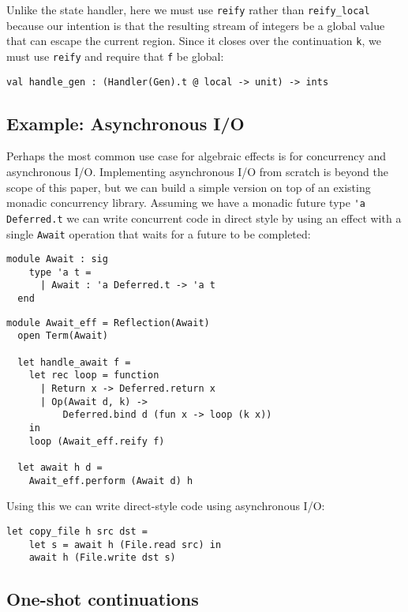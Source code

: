 \documentclass[acmsmall, screen, review, anonymous]{acmart}
\theoremstyle{definition}
\begin{document}
Unlike the state handler, here we must use
\lstinline[style=oxcaml]{reify} rather than
\lstinline[style=oxcaml]{reify_local} because our intention is that the
resulting stream of integers be a global value that can escape the
current region. Since it closes over the continuation
\lstinline[style=oxcaml]{k}, we must use \lstinline[style=oxcaml]{reify}
and require that \lstinline[style=oxcaml]{f} be global:
\begin{lstlisting}[style=oxcaml]
  val handle_gen : (Handler(Gen).t @ local -> unit) -> ints
\end{lstlisting}

\subsection{Example: Asynchronous I/O}

Perhaps the most common use case for algebraic effects is for
concurrency and asynchronous I/O. Implementing asynchronous I/O from
scratch is beyond the scope of this paper, but we can build a simple
version on top of an existing monadic concurrency library. Assuming we
have a monadic future type \lstinline[style=oxcaml]{'a Deferred.t} we can
write concurrent code in direct style by using an effect with a single
\lstinline[style=oxcaml]{Await} operation that waits for a future to be
completed:
\begin{lstlisting}[style=oxcaml]
  module Await : sig
    type 'a t =
      | Await : 'a Deferred.t -> 'a t
  end
\end{lstlisting}

\begin{lstlisting}[style=oxcaml]
  module Await_eff = Reflection(Await)
  open Term(Await)

  let handle_await f =
    let rec loop = function
      | Return x -> Deferred.return x
      | Op(Await d, k) ->
          Deferred.bind d (fun x -> loop (k x))
    in
    loop (Await_eff.reify f)

  let await h d =
    Await_eff.perform (Await d) h
\end{lstlisting}

Using this we can write direct-style code using asynchronous I/O:
\begin{lstlisting}[style=oxcaml]
  let copy_file h src dst =
    let s = await h (File.read src) in
    await h (File.write dst s)
\end{lstlisting}

\subsection{One-shot continuations}
\end{document}
